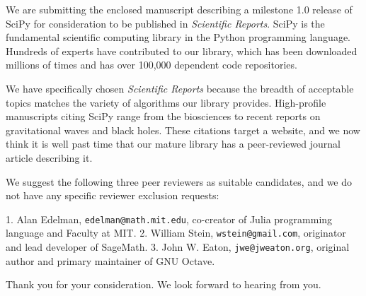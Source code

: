 \documentclass[10pt,stdletter,dateno]{newlfm}
\begin{document}
\begin{newlfm}

We are submitting the enclosed manuscript describing a milestone
1.0 release of SciPy for consideration to be published in
\emph{Scientific Reports}. SciPy is the fundamental scientific 
computing library in the Python programming language. 
Hundreds of experts have contributed to our library, which
has been downloaded millions of times and has over 100,000 dependent
code repositories.

We have specifically chosen \emph{Scientific Reports} because
the breadth of acceptable topics matches the variety of algorithms
our library provides. High-profile manuscripts citing SciPy range
from the biosciences to recent reports on gravitational waves and
black holes. These citations target a website, and we now think
it is well past time that our mature library has a peer-reviewed
journal article describing it.

We suggest the following three peer reviewers as suitable candidates,
and we do not have any specific reviewer exclusion requests:

1. Alan Edelman, \texttt{edelman@math.mit.edu}, co-creator of Julia
programming language and Faculty at MIT.
2. William Stein, \texttt{wstein@gmail.com}, originator and
lead developer of SageMath.
3. John W. Eaton, \texttt{jwe@jweaton.org}, original author and primary maintainer 
of GNU Octave.

Thank you for your consideration.  We look forward to
hearing from you.

\end{newlfm}
\end{document}
